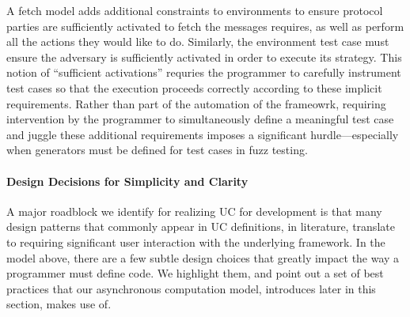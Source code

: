 A fetch model adds additional constraints to environments to ensure protocol parties are sufficiently activated to fetch the messages requires, as well as perform all the actions they would like to do. 
Similarly, the environment test case must ensure the adversary is sufficiently activated in order to execute its strategy. 
This notion of ``sufficient activations'' requries the programmer to carefully instrument test cases so that the execution proceeds correctly according to these implicit requirements.
Rather than part of the automation of the frameowrk, requiring intervention by the programmer to simultaneously define a meaningful test case and juggle these additional requirements imposes a significant hurdle---especially when generators must be defined for test cases in fuzz testing. 


\paragraph{Design Decisions for Simplicity and Clarity}
A major roadblock we identify for realizing UC for development is that many design patterns that commonly appear in UC definitions, in literature, translate to requiring significant user interaction with the underlying framework.
In the model above, there are a few subtle design choices that greatly impact the way a programmer must define code. 
We highlight them, and point out a set of best practices that our asynchronous computation model, introduces later in this section, makes use of.

